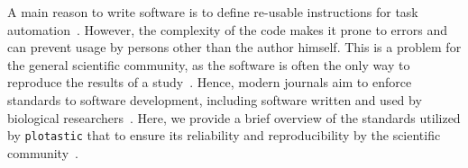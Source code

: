 
















A main reason to write software is to define re-usable instructions for task
automation~\cite{narztReusabilityConceptProcess1998}. However, the complexity of
the code makes it prone to errors and can prevent usage by persons other than
the author himself. This is a problem for the general scientific community, as
the software is often the only way to reproduce the results of a
study~\cite{sandveTenSimpleRules2013}. Hence, modern journals aim to enforce
standards to software development, including software written and used by
biological researchers~\cite{smithJournalOpenSource2018}. Here, we provide a
brief overview of the standards utilized by \texttt{plotastic} that to ensure
its reliability and reproducibility by the scientific community~\cite{pengReproducibleResearchComputational2011}.

